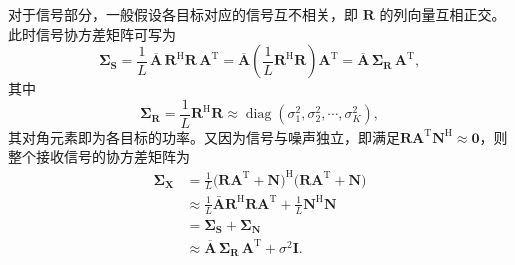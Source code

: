 对于信号部分，一般假设各目标对应的信号互不相关，即 \(\mathbf{R}\) 的列向量互相正交。此时信号协方差矩阵可写为
\[
    \mathbf{\Sigma}_{\mathbf{S}}
    = \frac{1}{L}\,\overline{\mathbf{A}}\,\mathbf{R}^{\mathrm{H}}\mathbf{R}\,\mathbf{A}^{\mathrm{T}}
    = \overline{\mathbf{A}}
    \left(\frac{1}{L}\mathbf{R}^{\mathrm{H}}\mathbf{R}\right)
    \mathbf{A}^{\mathrm{T}}
    = \overline{\mathbf{A}}\,\mathbf{\Sigma}_{\mathbf{R}}\,\mathbf{A}^{\mathrm{T}},
\]
其中
\[
    \mathbf{\Sigma}_{\mathbf{R}}
    = \frac{1}{L}\mathbf{R}^{\mathrm{H}}\mathbf{R}
    \approx \operatorname{diag}(\sigma_1^2,\sigma_2^2,\cdots,\sigma_K^2),
\]
其对角元素即为各目标的功率。又因为信号与噪声独立，即满足\(\mathbf{R}\mathbf{A}^{\mathrm{T}}\mathbf{N}^{\mathrm{H}} \approx \mathbf{0}\)，则整个接收信号的协方差矩阵为
\[
    \begin{split}
        \mathbf{\Sigma}_{\mathbf{X}}
         & = \frac{1}{L}\big(\mathbf{R}\mathbf{A}^{\mathrm{T}}+\mathbf{N}\big)^{\mathrm{H}}
        \big(\mathbf{R}\mathbf{A}^{\mathrm{T}}+\mathbf{N}\big)                                         \\
         & \approx \frac{1}{L}\mathbf{\bar{A}}\mathbf{R}^{\mathrm{H}}\mathbf{R}\mathbf{A}^{\mathrm{T}}
        + \frac{1}{L}\mathbf{N}^{\mathrm{H}}\mathbf{N}                                                 \\
         & = \mathbf{\Sigma}_{\mathbf{S}} + \mathbf{\Sigma}_{\mathbf{N}}                               \\
         & \approx \overline{\mathbf{A}}\,\mathbf{\Sigma}_{\mathbf{R}}\,\mathbf{A}^{\mathrm{T}}
        + \sigma^2 \mathbf{I}.
    \end{split}
\]

